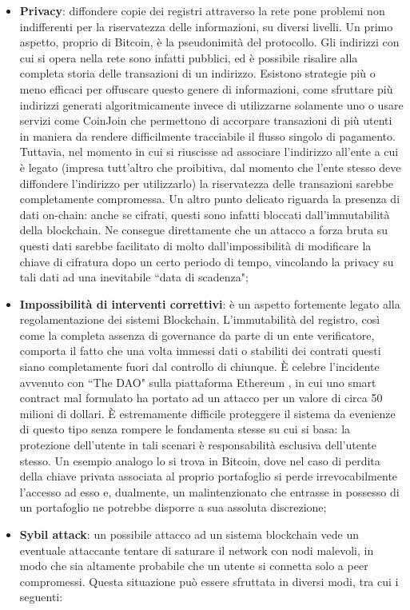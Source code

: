 \begin{itemize}
				\item \textbf{Privacy}: diffondere copie dei registri attraverso la rete pone problemi non indifferenti per la riservatezza delle informazioni, su diversi livelli. Un primo aspetto, proprio di Bitcoin, è la pseudonimità del protocollo. Gli indirizzi con cui si opera nella rete sono infatti pubblici, ed è possibile risalire alla completa storia delle transazioni di un indirizzo. Esistono strategie più o meno efficaci per offuscare questo genere di informazioni, come sfruttare più indirizzi generati algoritmicamente invece di utilizzarne solamente uno o usare servizi come CoinJoin che permettono di accorpare transazioni di più utenti in maniera da rendere difficilmente tracciabile il flusso singolo di pagamento. Tuttavia, nel momento in cui si riuscisse ad associare l'indirizzo all'ente a cui è legato (impresa tutt'altro che proibitiva, dal momento che l'ente stesso deve diffondere l'indirizzo per utilizzarlo) la riservatezza delle transazioni sarebbe completamente compromessa. Un altro punto delicato riguarda la presenza di dati on-chain: anche se cifrati, questi sono infatti bloccati dall'immutabilità della blockchain. Ne consegue direttamente che un attacco a forza bruta su questi dati sarebbe facilitato di molto dall'impossibilità di modificare la chiave di cifratura dopo un certo periodo di tempo, vincolando la privacy su tali dati ad una inevitabile ``data di scadenza"; 
				\item \textbf{Impossibilità di interventi correttivi}: è un aspetto fortemente legato alla regolamentazione dei sistemi Blockchain. L'immutabilità del registro, così come la completa assenza di governance da parte di un ente verificatore, comporta il fatto che una volta immessi dati o stabiliti dei contrati questi siano completamente fuori dal controllo di chiunque. È celebre l'incidente avvenuto con ``The DAO" sulla piattaforma Ethereum \cite{theDAO}, in cui uno smart contract mal formulato ha portato ad un attacco per un valore di circa 50 milioni di dollari. È estremamente difficile proteggere il sistema da evenienze di questo tipo senza rompere le fondamenta stesse su cui si basa: la protezione dell'utente in tali scenari è responsabilità esclusiva dell'utente stesso. Un esempio analogo lo si trova in Bitcoin, dove nel caso di perdita della chiave privata associata al proprio portafoglio si perde irrevocabilmente l'accesso ad esso e, dualmente, un malintenzionato che entrasse in possesso di un portafoglio ne potrebbe disporre a sua assoluta discrezione;
				\item \textbf{Sybil attack}: un possibile attacco ad un sistema blockchain vede un eventuale attaccante tentare di saturare il network con nodi malevoli, in modo che sia altamente probabile che un utente si connetta solo a peer compromessi. Questa situazione può essere sfruttata in diversi modi, tra cui i seguenti:

\end{itemize}
